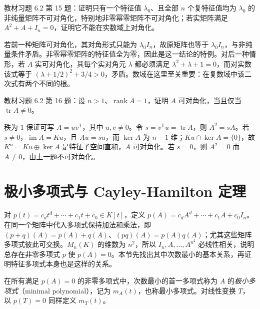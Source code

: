 \begin{example}
\label{ex:xie-62-15}
教材习题 6.2 第 15 题：证明只有一个特征值 $\lambda_0$、且全部 $n$ 个复特征值均为 $\lambda_0$ 的非纯量矩阵不可对角化，特别地非零幂零矩阵不可对角化；若实矩阵满足 $A^2+A+I_n=0$，证明它不能在实数域上对角化。
\end{example}
\begin{solve}
若前一种矩阵可对角化，其对角形式只能为 $\lambda_0I_n$，故原矩阵也等于 $\lambda_0I_n$，与非纯量条件矛盾。非零幂零矩阵的特征值全为零，因此是这一结论的特例。对后一种情形，若 $A$ 实可对角化，其每个实对角元 $\lambda$ 都必须满足 $\lambda^2+\lambda+1=0$，而对实数该式等于 $(\lambda+1/2)^2+3/4>0$，矛盾。数域在这里至关重要：在复数域中该二次式有两个不同的根。
\end{solve}

\begin{example}
\label{ex:xie-62-16}
教材习题 6.2 第 16 题：设 $n>1$、$\operatorname{rank}A=1$，证明 $A$ 可对角化，当且仅当 $\operatorname{tr}A\ne0$。
\end{example}
\begin{solve}
秩为 $1$ 保证可写 $A=uv^{\mathsf T}$，其中 $u,v\ne0$。令 $s=v^{\mathsf T}u=\operatorname{tr}A$，则 $A^2=sA$。若 $s\ne0$，$\operatorname{im}A=Ku$，且 $Au=su$，而 $\ker A$ 为 $n-1$ 维；$Ku\cap\ker A=\{0\}$，故 $K^n=Ku\oplus\ker A$ 是特征子空间直和，$A$ 可对角化。若 $s=0$，则 $A^2=0$ 而 $A\ne0$，由上一题不可对角化。
\end{solve}

\section{极小多项式与 Cayley-Hamilton 定理}
\label{sec:xie-minimal-polynomial}

对 $p(t)=c_dt^d+\cdots+c_1t+c_0\in K[t]$，定义 $p(A)=c_dA^d+\cdots+c_1A+c_0I_n$。在同一个矩阵中代入多项式保持加法和乘法，即 $(p+q)(A)=p(A)+q(A)$、$(pq)(A)=p(A)q(A)$；尤其这些矩阵多项式彼此可交换。$M_n(K)$ 的维数为 $n^2$，所以 $I_n,A,\ldots,A^{n^2}$ 必线性相关，说明总存在非零多项式 $p$ 使 $p(A)=0$。本节先找出其中次数最小的基本关系，再证明特征多项式本身也是这样的关系。

\begin{definition}
\label{def:xie-minimal-polynomial}
在所有满足 $p(A)=0$ 的非零多项式中，次数最小的首一多项式称为 $A$ 的\emph{极小多项式}（minimal polynomial），记为 $m_A(t)$，也称最小多项式。对线性变换 $T$，以 $p(T)=0$ 同样定义 $m_T(t)$。
\end{definition}


